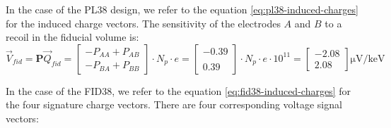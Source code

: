 In the case of the PL38 design, we refer to the equation \ref{eq:pl38-induced-charges} for the induced charge vectors. The sensitivity of the electrodes $A$ and $B$ to a recoil in the fiducial volume is:
\begin{equation}
\label{eq:planar38-sensitivity}
\vec{V}_{fid} = \bm{P} \vec{Q}_{fid} =
\begin{bmatrix}
- P_{AA} + P_{AB} \\ - P_{BA} + P_{BB}
\end{bmatrix}
\cdot N_p \cdot e
= 
\begin{bmatrix}
-0.39 \\  \\ 0.39
\end{bmatrix}
\cdot N_p \cdot e \cdot 10^{11}
= 
\begin{bmatrix}
-2.08 \\ 2.08 
\end{bmatrix}
\si{\micro\volt\per\kilo\eV}
\end{equation}

In the case of the FID38, we refer to the equation \ref{eq:fid38-induced-charges} for the four signature charge vectors. There are four corresponding voltage signal vectors:

